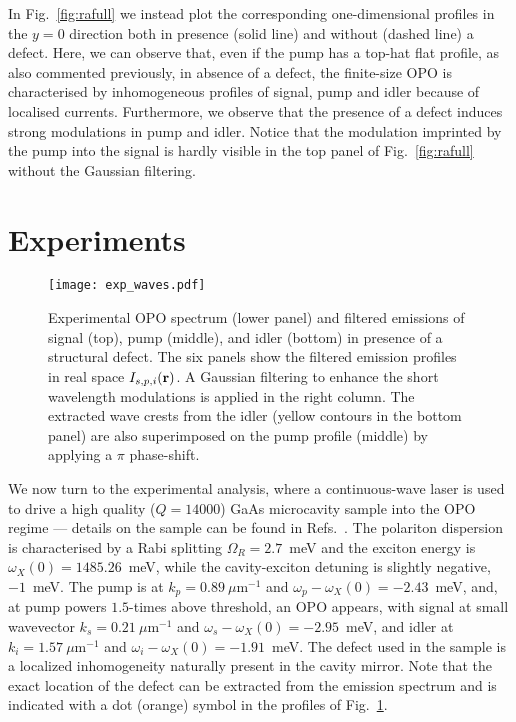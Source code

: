 %
In Fig.~\ref{fig:rafull} we instead plot the corresponding
one-dimensional profiles in the $y=0$ direction both in presence
(solid line) and without (dashed line) a defect. Here, we can observe
that, even if the pump has a top-hat flat profile, as also commented
previously, in absence of a defect, the finite-size OPO is
characterised by inhomogeneous profiles of signal, pump and idler
because of localised currents. Furthermore, we observe that the
presence of a defect induces strong modulations in pump and idler.
%
Notice that the modulation imprinted by the pump into the signal is
hardly visible in the top panel of Fig.~\ref{fig:rafull} without the
Gaussian filtering.


\section{Experiments}
\label{sec:daniele-experiments}

%
\afterpage{\clearpage}
\begin{figure}[p]\centering
  \texttt{[image: exp\_waves.pdf]}
  \caption{Experimental OPO spectrum (lower panel) and filtered
    emissions of signal (top), pump (middle), and idler (bottom) in
    presence of a structural defect. The six panels show the filtered
    emission profiles in real space $I_{s, p,i}(\mathbf{r})$. A Gaussian
    filtering to enhance the short wavelength modulations is applied
    in the right column. The extracted wave crests from the idler
    (yellow contours in the bottom panel) are also superimposed on the
    pump profile (middle) by applying a $\pi$ phase-shift.}
\label{fig:exper}
\end{figure}
%
We now turn to the experimental analysis, where a continuous-wave
laser is used to drive a high quality ($Q=14000$) GaAs microcavity
sample into the OPO regime --- details on the sample can be found in
Refs.~\cite{Ballarini_2013,Dominici_2014}.
The polariton dispersion is characterised by a Rabi splitting
$\Omega_R=2.7$~meV and the exciton energy is
$\omega_X(0)=1485.26$~meV, while the cavity-exciton detuning is
slightly negative, $-1$~meV. The pump is at $k_p=0.89~\mu$m$^{-1}$ and
$\omega_p - \omega_{X}(0)=-2.43$~meV, and, at pump powers $1.5$-times
above threshold, an OPO appears, with signal at small wavevector
$k_s=0.21~\mu$m$^{-1}$ and $\omega_s - \omega_{X}(0)=-2.95$~meV, and
idler at $k_i=1.57~\mu$m$^{-1}$ and
$\omega_i - \omega_{X}(0)=-1.91$~meV.
%
The defect used in the sample is a localized inhomogeneity naturally
present in the cavity mirror. Note that the exact location of the
defect can be extracted from the emission spectrum and is indicated
with a dot (orange) symbol in the profiles of Fig.~\ref{fig:exper}.

